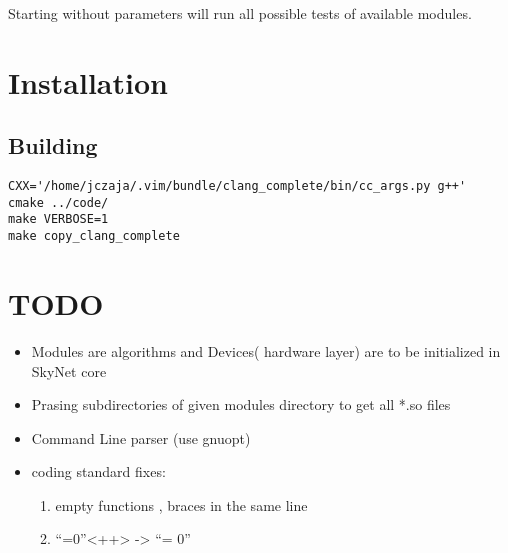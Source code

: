 \documentclass[a4paper,10pt]{article}
\begin{document}
Starting without parameters will run all possible tests of available modules.


\section{Installation}
\subsection{Building}
\begin{verbatim}
CXX='/home/jczaja/.vim/bundle/clang_complete/bin/cc_args.py g++'   cmake ../code/
make VERBOSE=1
make copy_clang_complete
\end{verbatim}

\section{TODO}
\begin{itemize}
\item Modules are algorithms and Devices( hardware layer) are to be initialized in SkyNet core
\item Prasing subdirectories of given modules directory to get all *.so files
\item Command Line parser (use gnuopt)
\item coding standard fixes:
\begin{enumerate}
\item empty functions , braces in the same line
\item ``=0''<++> -> ``= 0''
\end{enumerate}
\end{itemize}
\end{document}
